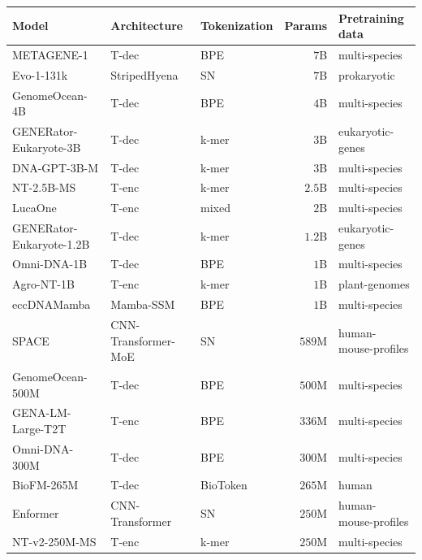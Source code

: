 \documentclass{llmxive}
\providecommand{\arraystretch}{1.05}
\begin{document}
\begin{table}[h]
\centering
\footnotesize
\setlength{\tabcolsep}{4pt}
\renewcommand{\arraystretch}{1.05}
\begin{tabular}{@{}lllrl@{}}
\toprule
\textbf{Model} & \textbf{Architecture} & \textbf{Tokenization} & \textbf{Params} & \textbf{Pretraining data} \\
\midrule
METAGENE-1                & T-dec               & BPE        & $7$B   & multi-species \\
Evo-1-131k                & StripedHyena        & SN         & $7$B   & prokaryotic \\
GenomeOcean-4B            & T-dec               & BPE        & $4$B   & multi-species \\
GENERator-Eukaryote-3B    & T-dec               & k-mer      & $3$B   & eukaryotic-genes \\
DNA-GPT-3B-M              & T-dec               & k-mer      & $3$B   & multi-species \\
NT-2.5B-MS                & T-enc               & k-mer      & $2.5$B & multi-species \\
LucaOne                   & T-enc               & mixed      & $2$B   & multi-species \\
GENERator-Eukaryote-1.2B  & T-dec               & k-mer      & $1.2$B & eukaryotic-genes \\
Omni-DNA-1B               & T-dec               & BPE        & $1$B   & multi-species \\
Agro-NT-1B                & T-enc               & k-mer      & $1$B   & plant-genomes \\
eccDNAMamba               & Mamba-SSM           & BPE        & $1$B   & multi-species \\
SPACE                     & CNN-Transformer-MoE & SN         & $589$M & human-mouse-profiles \\
GenomeOcean-500M          & T-dec               & BPE        & $500$M & multi-species \\
GENA-LM-Large-T2T         & T-enc               & BPE        & $336$M & multi-species \\
Omni-DNA-300M             & T-dec               & BPE        & $300$M & multi-species \\
BioFM-265M                & T-dec               & BioToken   & $265$M & human \\
Enformer                  & CNN-Transformer     & SN         & $250$M & human-mouse-profiles \\
NT-v2-250M-MS             & T-enc               & k-mer      & $250$M & multi-species \\

\end{tabular}
\end{table}
\end{document}
